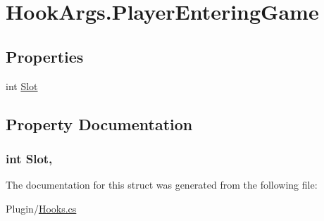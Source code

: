 \hypertarget{structOTA_1_1Plugin_1_1HookArgs_1_1PlayerEnteringGame}{}\section{Hook\+Args.\+Player\+Entering\+Game}
\label{structOTA_1_1Plugin_1_1HookArgs_1_1PlayerEnteringGame}
\subsection*{Properties}
\begin{DoxyCompactItemize}
\item 
int \hyperlink{structOTA_1_1Plugin_1_1HookArgs_1_1PlayerEnteringGame_a845a62ef01927ccc8bd45a41de3996f1}{Slot}
\end{DoxyCompactItemize}


\subsection{Property Documentation}
\hypertarget{structOTA_1_1Plugin_1_1HookArgs_1_1PlayerEnteringGame_a845a62ef01927ccc8bd45a41de3996f1}{}
\subsubsection[{Slot}]{\setlength{\rightskip}{0pt plus 5cm}int Slot\hspace{0.3cm}{\ttfamily [get]}, {\ttfamily [set]}}\label{structOTA_1_1Plugin_1_1HookArgs_1_1PlayerEnteringGame_a845a62ef01927ccc8bd45a41de3996f1}


The documentation for this struct was generated from the following file\+:\begin{DoxyCompactItemize}
\item 
Plugin/\hyperlink{Hooks_8cs}{Hooks.\+cs}\end{DoxyCompactItemize}
